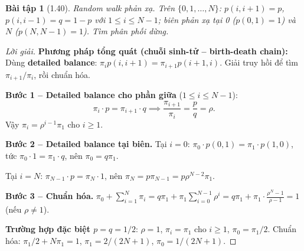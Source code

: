 \documentclass[8pt,a4paper]{article}
\newtheorem{exercise}{Bài tập}
\newenvironment{solution}{\begin{proof}[Lời giải]}{\end{proof}}
\begin{document}
\begin{exercise}[1.40]
Random walk phản xạ. Trên $\{0, 1, \ldots, N\}$: $p(i, i+1) = p$, $p(i, i-1) = q = 1-p$ với $1 \leq i \leq N-1$; biên phản xạ tại 0 ($p(0,1)=1$) và $N$ ($p(N, N-1)=1$). Tìm phân phối dừng.
\end{exercise}
\begin{solution}
\textbf{Phương pháp tổng quát (chuỗi sinh-tử -- birth-death chain):} Dùng \textbf{detailed balance}: $\pi_i p(i,i+1) = \pi_{i+1} p(i+1,i)$. Giải truy hồi để tìm $\pi_{i+1}/\pi_i$, rồi chuẩn hóa.

\textbf{Bước 1 -- Detailed balance cho phần giữa} ($1 \leq i \leq N-1$):
\[
  \pi_i \cdot p = \pi_{i+1} \cdot q \implies \frac{\pi_{i+1}}{\pi_i} = \frac{p}{q} = \rho.
\]
Vậy $\pi_i = \rho^{i-1} \pi_1$ cho $i \geq 1$.

\textbf{Bước 2 -- Detailed balance tại biên.}
Tại $i = 0$: $\pi_0 \cdot p(0,1) = \pi_1 \cdot p(1,0)$, tức $\pi_0 \cdot 1 = \pi_1 \cdot q$, nên $\pi_0 = q\pi_1$.

Tại $i = N$: $\pi_{N-1} \cdot p = \pi_N \cdot 1$, nên $\pi_N = p\pi_{N-1} = p\rho^{N-2}\pi_1$.

\textbf{Bước 3 -- Chuẩn hóa.}
$\pi_0 + \sum_{i=1}^N \pi_i = q\pi_1 + \pi_1 \sum_{i=0}^{N-1} \rho^i = q\pi_1 + \pi_1 \cdot \frac{\rho^N - 1}{\rho - 1} = 1$ (nếu $\rho \neq 1$).

\textbf{Trường hợp đặc biệt $p = q = 1/2$}: $\rho = 1$, $\pi_i = \pi_1$ cho $i \geq 1$, $\pi_0 = \pi_1/2$. Chuẩn hóa: $\pi_1/2 + N\pi_1 = 1$, $\pi_1 = 2/(2N+1)$, $\pi_0 = 1/(2N+1)$.
\end{solution}
\end{document}
